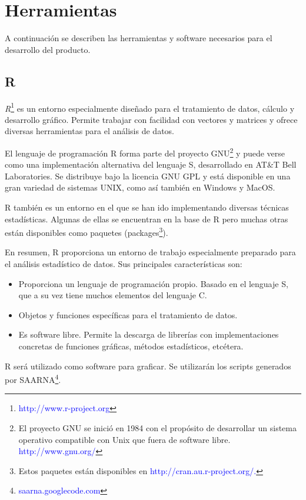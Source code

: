 \documentclass[12pt,a4paper,spanish]{article}
\begin{document}
\section{Herramientas} 
	A continuación se describen las herramientas y software necesarios para el desarrollo del producto.

	\subsection{R}
		\par \textit{R}\footnote{\textcolor{blue}{http://www.r-project.org}} es un entorno especialmente diseñado para el 			tratamiento de datos, cálculo y desarrollo gráfico. Permite trabajar con facilidad con vectores y matrices y 			ofrece diversas herramientas para el análisis de datos.
		\par El lenguaje de programación \textsc{R} forma parte del proyecto GNU\footnote{El proyecto GNU se inició en 			1984 con el propósito de desarrollar un sistema operativo compatible con Unix que fuera de software libre. 			\textcolor{blue}{http://www.gnu.org/}} y puede verse como una 		implementación alternativa del lenguaje 		\textsc{S}, desarrollado en AT\&T Bell Laboratories. Se distribuye bajo la licencia GNU GPL y está disponible en 			una gran variedad de sistemas UNIX, como así también en Windows y MacOS.
		\par \textsc{R} también es un entorno en el que se han ido implementando diversas técnicas estadísticas. Algunas 			de ellas se encuentran en la base de \textsc{R} pero muchas otras están disponibles como paquetes (packages\footnote{Estos paquetes están disponibles en \textcolor{blue}{http://cran.au.r-project.org/.}}).
		\par En resumen, R proporciona un entorno de trabajo especialmente preparado para el análisis estadístico de 			datos. Sus principales características son:

		\begin{itemize}
			\item Proporciona un lenguaje de programación propio. Basado en el lenguaje S, que a su vez tiene muchos 						elementos del lenguaje C. 
			\item Objetos y funciones específicas para el tratamiento de datos.
			\item Es software libre. Permite la descarga de librerías con implementaciones concretas de funciones 						gráficas, métodos estadísticos, etcétera.
		\end{itemize}
		\par \textsc{R} será utilizado como software para graficar. Se utilizarán los scripts generados por 
		SAARNA\footnote{\textcolor{blue}{saarna.googlecode.com}}.
\end{document}
